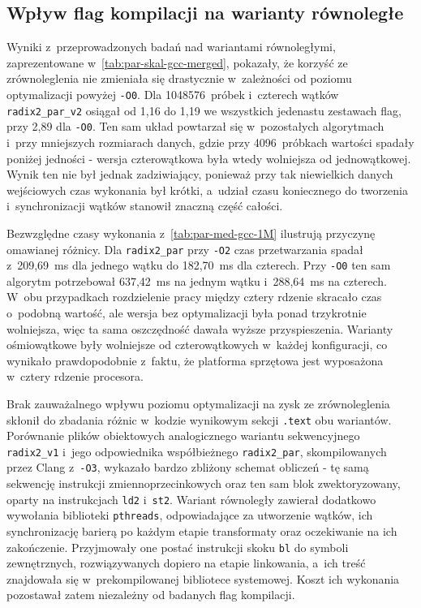 \subsection{Wpływ flag kompilacji na warianty równoległe}
Wyniki z~przeprowadzonych badań nad wariantami równoległymi, zaprezentowane
w~\cref{tab:par-skal-gcc-merged}, pokazały, że korzyść ze zrównoleglenia nie
zmieniała się drastycznie w~zależności od poziomu optymalizacji powyżej
\texttt{-O0}. Dla 1048576~próbek i~czterech wątków \texttt{radix2\_par\_v2}
osiągał od 1,16 do 1,19 we wszystkich jedenastu zestawach flag, przy 2,89 dla
\texttt{-O0}. Ten sam układ powtarzał się w~pozostałych algorytmach i~przy
mniejszych rozmiarach danych, gdzie przy 4096~próbkach wartości spadały poniżej
jedności - wersja czterowątkowa była wtedy wolniejsza od jednowątkowej. Wynik ten
nie był jednak zadziwiający, ponieważ przy tak niewielkich danych wejściowych
czas wykonania był krótki, a~udział czasu koniecznego do tworzenia
i~synchronizacji wątków stanowił znaczną część całości.

Bezwzględne czasy wykonania z~\cref{tab:par-med-gcc-1M} ilustrują przyczynę
omawianej różnicy. Dla \texttt{radix2\_par} przy \texttt{-O2} czas przetwarzania
spadał z~209,69~ms dla jednego wątku do 182,70~ms dla czterech. Przy \texttt{-O0}
ten sam algorytm potrzebował 637,42~ms na jednym wątku i~288,64~ms na czterech.
W~obu przypadkach rozdzielenie pracy między cztery rdzenie skracało czas o~podobną
wartość, ale wersja bez optymalizacji była ponad trzykrotnie wolniejsza, więc ta
sama oszczędność dawała wyższe przyspieszenia. Warianty ośmiowątkowe były wolniejsze
od czterowątkowych w~każdej konfiguracji, co wynikało prawdopodobnie z~faktu, że
platforma sprzętowa jest wyposażona w~cztery rdzenie procesora.

Brak zauważalnego wpływu poziomu optymalizacji na zysk ze zrównoleglenia skłonił
do zbadania różnic w~kodzie wynikowym sekcji \texttt{.text} obu wariantów.
Porównanie plików obiektowych analogicznego wariantu sekwencyjnego
\texttt{radix2\_v1} i~jego odpowiednika współbieżnego \texttt{radix2\_par},
skompilowanych przez Clang z~\texttt{-O3}, wykazało bardzo zbliżony schemat
obliczeń - tę samą sekwencję instrukcji zmiennoprzecinkowych oraz ten sam blok
zwektoryzowany, oparty na instrukcjach \texttt{ld2} i~\texttt{st2}. Wariant
równoległy zawierał dodatkowo wywołania biblioteki \texttt{pthreads},
odpowiadające za utworzenie wątków, ich synchronizację barierą po każdym etapie
transformaty oraz oczekiwanie na ich zakończenie. Przyjmowały one postać instrukcji
skoku \texttt{bl} do symboli zewnętrznych, rozwiązywanych dopiero na etapie
linkowania, a~ich treść znajdowała się w~prekompilowanej bibliotece systemowej.
Koszt ich wykonania pozostawał zatem niezależny od badanych flag kompilacji.


